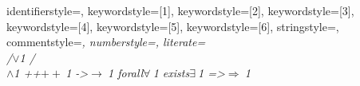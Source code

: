 {identifierstyle={\color{black}},
keywordstyle=[1]{\color{violet}},
keywordstyle=[2]{\color{forestgreen}},
keywordstyle=[3]{\color{forestgreen}},
keywordstyle=[4]{\color{blue}},
keywordstyle=[5]{\color{red}},
keywordstyle=[6]{\color{violet}},
stringstyle=,
commentstyle=\it\ttfamily\color{brown},
numberstyle=\tiny,
literate={\\/}{{$\vee$}}1
         {/\\}{{$\wedge$}}1
         {++}{{$+\!+\!~$}}1
         {->}{{$\to~$}}1
         {forall}{{$\forall~$}}1
         {exists}{{$\exists~$}}1
         {=>}{{$\Rightarrow~$}}1
}

